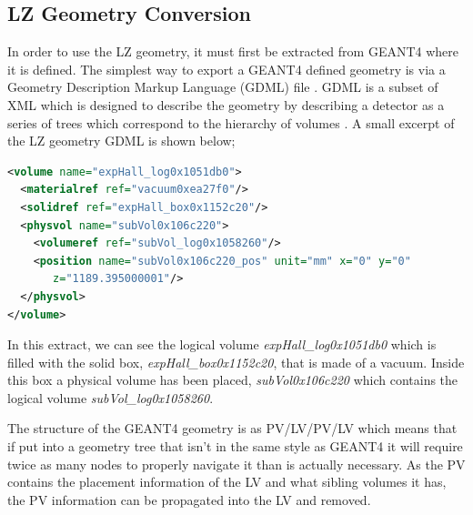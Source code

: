 \subsection{LZ Geometry Conversion}
\par
In order to use the LZ geometry, it must first be extracted from GEANT4 where it is defined.
The simplest way to export a GEANT4 defined geometry is via a Geometry Description Markup Language (GDML) file \cite{GDML_USER_GUIDE_ref}.
GDML is a subset of XML which is designed to describe the geometry by describing a detector as a series of trees which correspond to the hierarchy of volumes \cite{GDML_USER_GUIDE_ref}.
A small excerpt of the LZ geometry GDML is shown below;
\begin{lstlisting}[backgroundcolor=\color{lightgrey},
                   language=XML, xleftmargin = 0.5cm]
<volume name="expHall_log0x1051db0">
  <materialref ref="vacuum0xea27f0"/>
  <solidref ref="expHall_box0x1152c20"/>
  <physvol name="subVol0x106c220">
    <volumeref ref="subVol_log0x1058260"/>
    <position name="subVol0x106c220_pos" unit="mm" x="0" y="0"
       z="1189.395000001"/>
  </physvol>
</volume>
\end{lstlisting}
In this extract, we can see the logical volume \textit{expHall\_log0x1051db0} which is filled with the solid box, \textit{expHall\_box0x1152c20}, that is made of a vacuum.
Inside this box a physical volume has been placed, \textit{subVol0x106c220} which contains the logical volume \textit{subVol\_log0x1058260}.
\par
The structure of the GEANT4 geometry is as PV/LV/PV/LV which means that if put into a geometry tree that isn't in the same style as GEANT4 it will require twice as many nodes to properly navigate it than is actually necessary.
As the PV contains the placement information of the LV and what sibling volumes it has, the PV information can be propagated into the LV and removed.

